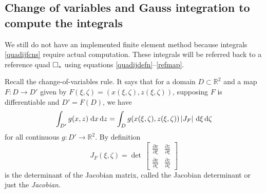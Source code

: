 \documentclass[11pt,final,reqno]{amsart}
\theoremstyle{remark}
\theoremstyle{definition}
\newcommand{\RR}{\mathbb{R}}
\begin{document}
\newcommand{\dxidzeta}{\,\mathrm{d}\xi\,\mathrm{d}\zeta}

\subsection*{Change of variables and Gauss integration to compute the integrals}  We still do not have an implemented finite element method because integrals \eqref{quadijfcns} require actual computation.  These integrals will be referred back to a reference quad $\square_{\ast}$ using equations \eqref{quadijdefn}--\eqref{refmap}.

Recall the change-of-variables rule.  It says that for a domain $D\subset \RR^2$ and a map $F:D \to D'$ given by $F(\xi,\zeta)=(x(\xi,\zeta),z(\xi,\zeta))$, supposing $F$ is differentiable and $D'=F(D)$, we have
\begin{equation}
  \int_{D'} g(x,z)\dxdz = \int_D g(x(\xi,\zeta),z(\xi,\zeta))\,|J_F|\,\dxidzeta \label{changeofvars}
\end{equation}
for all continuous $g:D' \to \RR^2$.  By definition
	$$J_F(\xi,\zeta) = \det\,\begin{bmatrix}
	                            \frac{\partial x}{\partial \xi} & \frac{\partial z}{\partial \xi} \\
	                            \frac{\partial x}{\partial \zeta} & \frac{\partial z}{\partial \zeta}
	                          \end{bmatrix}$$
is the determinant of the Jacobian matrix, called the Jacobian determinant or just the \emph{Jacobian}.  
\end{document}
